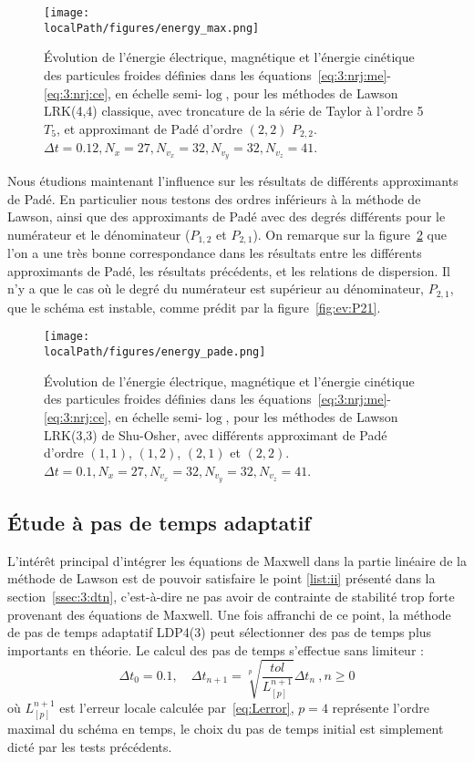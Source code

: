 \begin{figure}[h]
  \centering
  \texttt{[image: \\localPath/figures/energy\_max.png]}
  \caption{Évolution de l'énergie électrique, magnétique et l'énergie cinétique des particules froides définies dans les équations~\ref{eq:3:nrj:me}-\ref{eq:3:nrj:ce}, en échelle semi-$\log$, pour les méthodes de Lawson LRK(4,4) classique, avec troncature de la série de Taylor à l'ordre 5 $T_5$, et approximant de Padé d'ordre $(2,2)$ $P_{2,2}$. $\Delta t = 0.12, N_x=27, N_{v_x}=32, N_{v_y}=32, N_{v_z}=41$.}
  \label{fig:approx:energies:cfl}
\end{figure}

Nous étudions maintenant l'influence sur les résultats de différents approximants de Padé. En particulier nous testons des ordres inférieurs à la méthode de Lawson, ainsi que des approximants de Padé avec des degrés différents pour le numérateur et le dénominateur ($P_{1,2}$ et $P_{2,1}$). On remarque sur la figure~\ref{fig:approx:energies:pade} que l'on a une très bonne correspondance dans les résultats entre les différents approximants de Padé, les résultats précédents, et les relations de dispersion. Il n'y a que le cas où le degré du numérateur est supérieur au dénominateur, $P_{2,1}$, que le schéma est instable, comme prédit par la figure~\ref{fig:ev:P21}.

\begin{figure}[h]
  \centering
  \texttt{[image: \\localPath/figures/energy\_pade.png]}
  \caption{Évolution de l'énergie électrique, magnétique et l'énergie cinétique des particules froides définies dans les équations~\ref{eq:3:nrj:me}-\ref{eq:3:nrj:ce}, en échelle semi-$\log$, pour les méthodes de Lawson LRK(3,3) de Shu-Osher, avec différents approximant de Padé d'ordre $(1,1)$, $(1,2)$, $(2,1)$ et $(2,2)$. $\Delta t = 0.1, N_x=27, N_{v_x}=32, N_{v_y}=32, N_{v_z}=41$.}
  \label{fig:approx:energies:pade}
\end{figure}


\FloatBarrier
\subsection{Étude à pas de temps adaptatif}

L'intérêt principal d'intégrer les équations de Maxwell dans la partie linéaire de la méthode de Lawson est de pouvoir satisfaire le point \ref{list:ii} présenté dans la section~\ref{ssec:3:dtn}, c'est-à-dire ne pas avoir de contrainte de stabilité trop forte provenant des équations de Maxwell. Une fois affranchi de ce point, la méthode de pas de temps adaptatif LDP4(3) peut sélectionner des pas de temps plus importants en théorie. Le calcul des pas de temps s'effectue sans limiteur :
$$
  \Delta t_0 = 0.1,\quad \Delta t_{n+1} = \sqrt[p]{\frac{tol}{L_{[p]}^{n+1}}}\Delta t_n\ ,n\geq 0
$$
où $L_{[p]}^{n+1}$ est l'erreur locale calculée par~\ref{eq:Lerror}, $p=4$ représente l'ordre maximal du schéma en temps, le choix du pas de temps initial est simplement dicté par les tests précédents.

